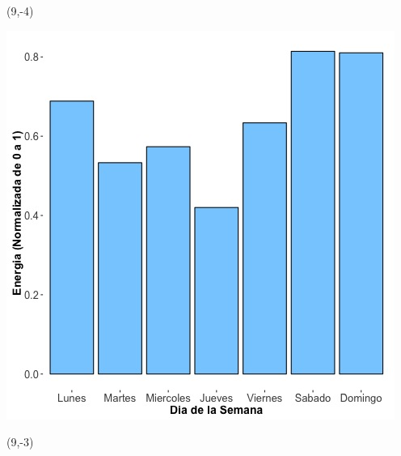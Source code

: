 \documentclass{article}\usepackage[]{graphicx}\usepackage[]{color}
\newenvironment{knitrout}{}{} %
\begin{document}
 \begin{textblock}{1}(9,-4)
\begin{minipage}{20em}
\begingroup

\endgroup
\end{minipage}
\end{textblock}


\begin{knitrout}
\color{fgcolor}
\includegraphics[scale=0.65]{figure/A16_day_of_week_plot} 
\end{knitrout}


 \begin{textblock}{1}(9,-3)
\begin{minipage}{20em}
\begingroup

\endgroup
\end{minipage}
\end{textblock}
\end{document}
